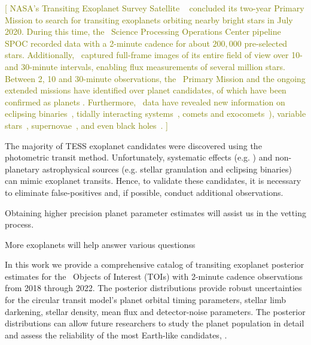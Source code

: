 \documentclass[floatfix,ApJL,twocolumn]{aastex631}
\begin{document}
\textcolor{olive}{[
NASA's Transiting Exoplanet Survey Satellite \tess\ \citep{Ricker:2015:JATIS} concluded its two-year Primary Mission to search for transiting exoplanets orbiting nearby bright stars in July 2020.
During this time, the \tess\ Science Processing Operations Center pipeline SPOC \citep{Jenkins:2016:SPIE}  recorded data with a 2-minute cadence for about $200,000$ pre-selected stars. 
Additionally, \tess\ captured full-frame images of its entire field of view over 10- and 30-minute intervals, enabling flux measurements of several million stars. 
Between 2, 10 and 30-minute observations, the \tess\ Primary Mission and the ongoing extended missions have identified over \red{$\numTessCandidates$} planet candidates, \red{$\numTessPlanets$} of which have been confirmed as planets \citep{Stassun:2018:AJ, Stassun:2019:AJ, Guerrero:2021:ApJS, Guerrero:2021:AAS}. Furthermore, \tess\ data have revealed new information on eclipsing binaries~\citep{ Guo:2020:MNRAS, Powell:2021:AJ}, tidally interacting systems~\citet{Holoien:2019:ApJ}, comets and exocomets~\citep{Farnham:2019:ApJL, Zieba:2019:A&A, Kuznyetsova:2020:OAP, Woods:2021:PASP, Pavlenko:2021:KPCB}),  variable stars~\citet{Antoci:2019:MNRAS, Handler:2020:NatAs}, supernovae~\cite{Vallely:2021:MNRAS, Fausnaugh:2021:ApJ}, and even black holes~\cite{Jayasinghe:2021:MNRAS}. 
]}


The majority of TESS exoplanet candidates were discovered using the photometric transit method.
Unfortunately, systematic effects (e.g. ) and non-planetary astrophysical sources (e.g. stellar granulation and eclipsing binaries) can mimic exoplanet transits.
Hence, to validate these candidates, it is necessary to eliminate false-positives and, if possible, conduct additional observations.

Obtaining higher precision planet parameter estimates will assist us in the vetting process.

More exoplanets will help answer various questionss





In this work we provide a comprehensive catalog of transiting exoplanet posterior estimates for the \red{\numAnalysed} \tess\ Objects of Interest (TOIs) with 2-minute cadence observations from 2018 through 2022. 
The posterior distributions provide robust uncertainties for the circular transit model's planet orbital timing parameters, stellar limb darkening, stellar density, mean flux and detector-noise parameters. 
The posterior distributions can allow future researchers to study the planet population in detail and assess the reliability of the most Earth-like candidates, .
\end{document}
